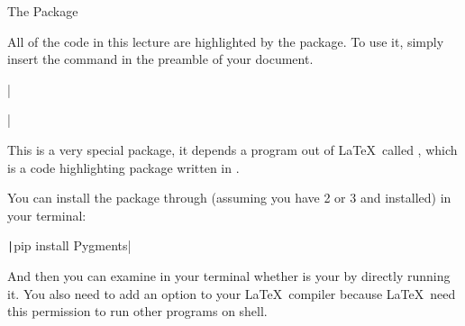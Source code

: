 \begin{frame}[fragile]{The  Package}

All of the code in this lecture are highlighted by the  package. To use it, simply insert the command in the preamble of your document.

\begin{command}
\LC|\usepackage{minted}|
\end{command}

This is a very special package, it depends a program out of \LaTeX\, called , which is a code highlighting package written in . \medskip

You can install the package through  (assuming you have  2 or 3 and  installed) in your terminal:

\begin{command}
\texttt|pip install Pygments|
\end{command}

And then you can examine in your terminal whether  is your  by directly running it. You also need to add an option  to your \LaTeX\ compiler because \LaTeX\ need this permission to run other programs on shell.

\end{frame}
